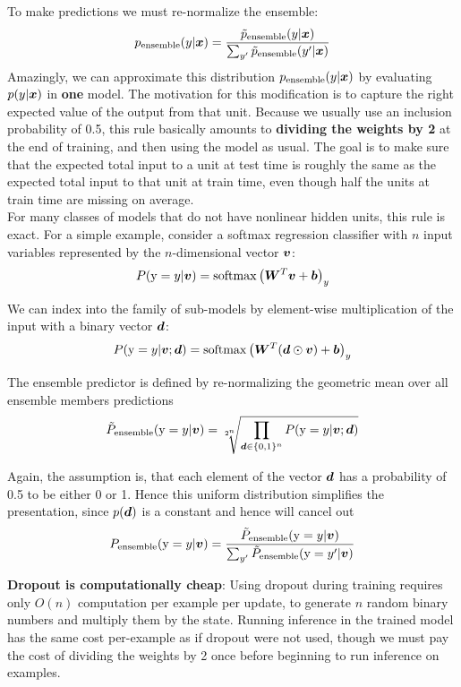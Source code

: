 \begin{multicols}{2}
	To make predictions we must re-normalize the ensemble:
	\[ p_{\text{ensemble}}(y|{\bm{x}}) = \frac{\tilde{p}_{\text{ensemble}}(y|{\bm{x}})}{\sum_{y'}\tilde{p}_{\text{ensemble}}(y'|{\bm{x}})} \]
	Amazingly, we can approximate this distribution $p_{\text{ensemble}}(y|{\bm{x}})$ by evaluating $p(y|{\bm{x}})$ in \textbf{one} model.
	The motivation for this modification is to capture the right expected value of the output from that unit.
	Because we usually use an inclusion probability of 0.5, this rule basically amounts to \textbf{dividing the weights by 2} at the end of training, and then using the model as usual.
	The goal is to make sure that the expected total input to a unit at test time is roughly the same as the expected total input to that unit at train time, even though half the units at train time are missing on average.\\

	For many classes of models that do not have nonlinear hidden units, this rule is exact.
	For a simple example, consider a softmax regression classifier with $n$ input variables represented by the $n$-dimensional vector ${\bm{v}}$:
	\[ P({\textnormal{y}}=y|{\bm{v}}) =\mathrm{softmax}\left({\bm{W}}^T{\bm{v}}+{\bm{b}}\right)_y \]

	We can index into the family of sub-models by element-wise multiplication of the input with a binary vector ${\bm{d}}$:
	\[ P({\textnormal{y}}=y|{\bm{v}};{\bm{d}}) = \mathrm{softmax}\left({\bm{W}}^T({\bm{d}}\odot{\bm{v}})+{\bm{b}}\right)_y \]

	The ensemble predictor is defined by re-normalizing the geometric mean over all ensemble members predictions
	\[ \tilde{P}_{\text{ensemble}}({\textnormal{y}}=y|{\bm{v}}) = \sqrt[2^n]{\prod_{{\bm{d}}\in\{0,1\}^n} P({\textnormal{y}}=y|{\bm{v}};{\bm{d}})} \]

	Again, the assumption is, that each element of the vector ${\bm{d}}$ has a probability of 0.5 to be either 0 or 1. Hence this uniform distribution simplifies the presentation, since $p({\bm{d}})$ is a constant and hence will cancel out
	\[ P_{\text{ensemble}}({\textnormal{y}}=y|{\bm{v}}) = \frac{\tilde{P}_{\text{ensemble}}({\textnormal{y}}=y|{\bm{v}})} {\sum_{y'}\tilde{P}_{\text{ensemble}}({\textnormal{y}}=y'|{\bm{v}})} \]

	\textbf{Dropout is computationally cheap}: Using dropout during training requires only $O(n)$ computation per example per update, to generate $n$ random binary numbers and multiply them by the state.
	Running inference in the trained model has the same cost per-example as if dropout were not used, though we must pay the cost of dividing the weights by 2 once before beginning to run inference on examples.\\


\end{multicols}
